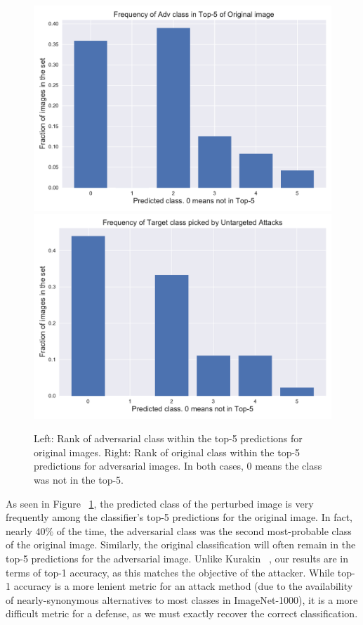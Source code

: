 \begin{figure}[H]
\centering
   \includegraphics[width=0.49\linewidth]{figures/pixel/untargeted.pdf}
   \includegraphics[width=0.49\linewidth]{figures/pixel/retargeted.pdf}
   \caption[Overlap of Classes under Adversary]{Left: Rank of adversarial class within the top-5 predictions for original images.  Right: Rank of original class within the top-5 predictions for adversarial images.  In both cases, 0 means the class was not in the top-5.}
   \label{fig:untarget}
\end{figure}
As seen in Figure ~\ref{fig:untarget}, the predicted class of the perturbed image is very frequently among the classifier's top-5 predictions for the original image.
In fact, nearly $40\%$ of the time, the adversarial class was the second most-probable class of the original image.
Similarly, the original classification will often remain in the top-5 predictions for the adversarial image.
Unlike Kurakin \etal ~\cite{Kurakin2016AdversarialEI}, our results are in terms of top-1 accuracy, as this matches the objective of the attacker.
While top-1 accuracy is a more lenient metric for an attack method (due to the availability of nearly-synonymous alternatives to most classes in ImageNet-1000), it is a more difficult metric for a defense, as we must exactly recover the correct classification.
